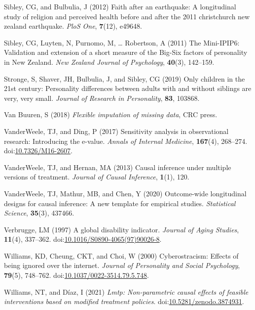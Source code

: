 \documentclass[
  singlecolumn]{article}
\newlength{\cslhangindent}
\newenvironment{CSLReferences}[2] %
 {\begin{list}{}{%
  \setlength{\itemindent}{0pt}
  \setlength{\leftmargin}{0pt}
  \setlength{\parsep}{0pt}
  \ifodd #1
   \setlength{\leftmargin}{\cslhangindent}
   \setlength{\itemindent}{-1\cslhangindent}
  \fi
  \setlength{\itemsep}{#2\baselineskip}}}
 {\end{list}}
\begin{document}
\begin{CSLReferences}{1}{0}
Sibley, CG, and Bulbulia, J (2012) Faith after an earthquake: A
longitudinal study of religion and perceived health before and after the
2011 christchurch new zealand earthquake. \emph{PloS One},
\textbf{7}(12), e49648.

Sibley, CG, Luyten, N, Purnomo, M, \ldots{} Robertson, A (2011) The
Mini-IPIP6: Validation and extension of a short measure of the Big-Six
factors of personality in New Zealand. \emph{New Zealand Journal of
Psychology}, \textbf{40}(3), 142--159.

Stronge, S, Shaver, JH, Bulbulia, J, and Sibley, CG (2019) Only children
in the 21st century: Personality differences between adults with and
without siblings are very, very small. \emph{Journal of Research in
Personality}, \textbf{83}, 103868.

Van Buuren, S (2018) \emph{Flexible imputation of missing data}, CRC
press.

VanderWeele, TJ, and Ding, P (2017) Sensitivity analysis in
observational research: Introducing the e-value. \emph{Annals of
Internal Medicine}, \textbf{167}(4), 268--274.
doi:\href{https://doi.org/10.7326/M16-2607}{10.7326/M16-2607}.

VanderWeele, TJ, and Hernan, MA (2013) Causal inference under multiple
versions of treatment. \emph{Journal of Causal Inference},
\textbf{1}(1), 120.

VanderWeele, TJ, Mathur, MB, and Chen, Y (2020) Outcome-wide
longitudinal designs for causal inference: A new template for empirical
studies. \emph{Statistical Science}, \textbf{35}(3), 437466.

Verbrugge, LM (1997) A global disability indicator. \emph{Journal of
Aging Studies}, \textbf{11}(4), 337--362.
doi:\href{https://doi.org/10.1016/S0890-4065(97)90026-8}{10.1016/S0890-4065(97)90026-8}.

Williams, KD, Cheung, CKT, and Choi, W (2000) Cyberostracism: Effects of
being ignored over the internet. \emph{Journal of Personality and Social
Psychology}, \textbf{79}(5), 748--762.
doi:\href{https://doi.org/10.1037/0022-3514.79.5.748}{10.1037/0022-3514.79.5.748}.

Williams, NT, and Díaz, I (2021) \emph{Lmtp: Non-parametric causal
effects of feasible interventions based on modified treatment policies}.
doi:\href{https://doi.org/10.5281/zenodo.3874931}{10.5281/zenodo.3874931}.

\end{CSLReferences}
\end{document}
